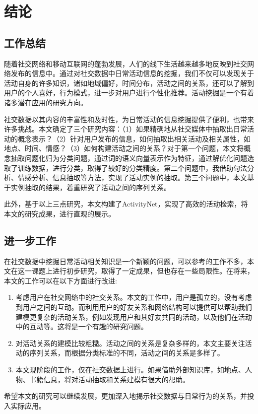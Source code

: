 \chapter{结论}

\section{工作总结}
随着社交网络和移动互联网的蓬勃发展，人们的线下生活越来越多地反映到社交网络发布的信息中。通过对社交数据中日常活动信息的挖掘，我们不仅可以发现关于活动自身的许多知识，诸如地域偏好，时间分布，活动之间的关系，还可以了解到用户的个人喜好，行为模式，进一步对用户进行个性化推荐。活动挖掘是一个有着诸多潜在应用的研究方向。

社交数据以其内容的丰富性和及时性，为日常活动的信息挖掘提供了便利，也带来许多挑战。本文确定了三个研究内容：（1）如果精确地从社交媒体中抽取出日常活动的概念表示？（2）针对用户发布的信息，如何抽取出相关活动及相关属性，如地点、时间、情感？（3）如何构建活动之间的关系？对于第一个问题，本文将概念抽取问题化归为分类问题，通过词的语义向量表示作为特征，通过解优化问题选取了训练数据，进行分类，取得了较好的分类精度。第二个问题中，我借助句法分析、情感分析、信息抽取等方法，实现了活动实例的抽取。第三个问题中，本文基于实例抽取的结果，着重研究了活动之间的序列关系。

此外，基于以上三点研究，本文构建了ActivityNet，实现了高效的活动检索，将本文的研究成果，进行直观的展示。

\section{进一步工作}
在社交数据中挖掘日常活动相关知识是一个新颖的问题，可以参考的工作不多，本文在这一课题上进行初步研究，取得了一定成果，但也存在一些局限性。在将来，本文的工作可以在以下方面进行改进:
\begin{enumerate}
	\item 考虑用户在社交网络中的社交关系。本文的工作中，用户是孤立的，没有考虑到用户之间的互动。而利用用户的好友关系和网络结构可以提供可以帮助我们建模更复杂的活动关系，例如发现用户和其好友共同的活动，以及他们在活动中的互动等。这将是一个有趣的研究问题。
	\item 对活动关系的建模比较粗糙。活动之间的关系是复杂多样的，本文主要关注活动的序列关系，而根据分类标准的不同，活动之间的关系是多样了。
	\item 本文现阶段的工作，仅在社交数据上进行。如果借助外部知识库，如地点、人物、书籍信息，将对活动抽取和关系建模有很大的帮助。
\end{enumerate}

希望本文的研究可以继续发展，更加深入地揭示社交数据与日常行为的关系，并投入实际应用。